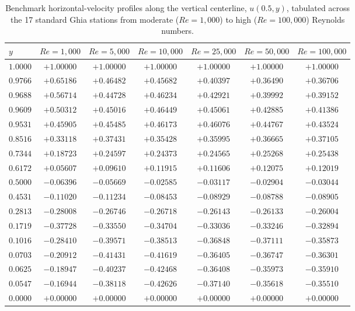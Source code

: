 \documentclass[11pt,a4paper]{article}
\begin{document}
\begin{table}[htbp]
\centering
\footnotesize
\setlength{\tabcolsep}{3.5pt}
\caption{Benchmark horizontal-velocity profiles along the vertical centerline, $u(0.5, y)$, tabulated across the 17 standard Ghia stations from moderate ($Re = 1,000$) to high ($Re = 100,000$) Reynolds numbers.}
\label{tab:ghia_u_benchmark}
\begin{tabular*}{\textwidth}{@{\extracolsep{\fill}}lcccccc@{}}
\toprule
$y$ & $Re = 1,000$ & $Re = 5,000$ & $Re = 10,000$ & $Re = 25,000$ & $Re = 50,000$ & $Re = 100,000$ \\
\midrule
$1.0000$ & $+1.00000$ & $+1.00000$ & $+1.00000$ & $+1.00000$ & $+1.00000$ & $+1.00000$ \\
$0.9766$ & $+0.65186$ & $+0.46482$ & $+0.45682$ & $+0.40397$ & $+0.36490$ & $+0.36706$ \\
$0.9688$ & $+0.56714$ & $+0.44728$ & $+0.46234$ & $+0.42921$ & $+0.39992$ & $+0.39152$ \\
$0.9609$ & $+0.50312$ & $+0.45016$ & $+0.46449$ & $+0.45061$ & $+0.42885$ & $+0.41386$ \\
$0.9531$ & $+0.45905$ & $+0.45485$ & $+0.46173$ & $+0.46076$ & $+0.44767$ & $+0.43524$ \\
$0.8516$ & $+0.33118$ & $+0.37431$ & $+0.35428$ & $+0.35995$ & $+0.36665$ & $+0.37105$ \\
$0.7344$ & $+0.18723$ & $+0.24597$ & $+0.24373$ & $+0.24565$ & $+0.25268$ & $+0.25438$ \\
$0.6172$ & $+0.05607$ & $+0.09610$ & $+0.11915$ & $+0.11606$ & $+0.12075$ & $+0.12019$ \\
$0.5000$ & $-0.06396$ & $-0.05669$ & $-0.02585$ & $-0.03117$ & $-0.02904$ & $-0.03044$ \\
$0.4531$ & $-0.11020$ & $-0.11234$ & $-0.08453$ & $-0.08929$ & $-0.08788$ & $-0.08905$ \\
$0.2813$ & $-0.28008$ & $-0.26746$ & $-0.26718$ & $-0.26143$ & $-0.26133$ & $-0.26004$ \\
$0.1719$ & $-0.37728$ & $-0.33550$ & $-0.34704$ & $-0.33036$ & $-0.33246$ & $-0.32894$ \\
$0.1016$ & $-0.28410$ & $-0.39571$ & $-0.38513$ & $-0.36848$ & $-0.37111$ & $-0.35873$ \\
$0.0703$ & $-0.20912$ & $-0.41431$ & $-0.41619$ & $-0.36405$ & $-0.36747$ & $-0.36301$ \\
$0.0625$ & $-0.18947$ & $-0.40237$ & $-0.42468$ & $-0.36408$ & $-0.35973$ & $-0.35910$ \\
$0.0547$ & $-0.16944$ & $-0.38118$ & $-0.42626$ & $-0.37140$ & $-0.35618$ & $-0.35510$ \\
$0.0000$ & $+0.00000$ & $+0.00000$ & $+0.00000$ & $+0.00000$ & $+0.00000$ & $+0.00000$ \\
\bottomrule
\end{tabular*}
\end{table}
\end{document}
